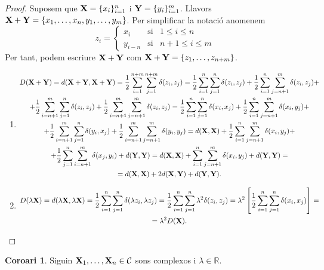 \documentclass{article}
\theoremstyle{definition}
\newtheorem{corollary}[definition]{Coro\lgem ari}
\newcommand{\0}{\ensuremath{\vb{0}}}
\newcommand{\X}{\ensuremath{\vb{X}}}
\newcommand{\Y}{\ensuremath{\vb{Y}}}
\newcommand{\RR}{\ensuremath{\mathbb{R}}} %
\begin{document}
\begin{proof}
    Suposem que $\X=\{x_i\}_{i=1}^n$ i $\Y=\{y_i\}_{i=1}^m$. Llavors $\X+\Y=\{x_1,\ldots,x_n,y_1,\ldots,y_m\}$. Per simplificar la notació anomenem $$
    z_i=\left\{
    \begin{array}{ccc}
        x_i & \text{si} & 1\leq i\leq n\\
        y_{i-n} & \text{si} & n+1\leq i\leq m
    \end{array}\right.
    $$ Per tant, podem escriure $\X+\Y$ com $\X+\Y=\{z_1,\ldots,z_{n+m}\}$.
    \begin{enumerate}
        \item 
        \begin{multline*}
            D(\X+\Y)=d(\X+\Y,\X+\Y)=\frac{1}{2}\sum_{i=1}^{n+m}\sum_{j=1}^{n+m}\delta(z_i,z_j)=\frac{1}{2}\sum_{i=1}^n\sum_{j=1}^n\delta(z_i,z_j)+\frac{1}{2}\sum_{i=1}^n\sum_{j=n+1}^m\delta(z_i,z_j)+\\+\frac{1}{2}\sum_{i=n+1}^m\sum_{j=1}^n\delta(z_i,z_j)+\frac{1}{2}\sum_{i=n+1}^m\sum_{j=n+1}^m\delta(z_i,z_j)=\frac{1}{2}\sum_{i=1}^n\sum_{j=1}^n\delta(x_i,x_j)+\frac{1}{2}\sum_{i=1}^n\sum_{j=n+1}^m\delta(x_i,y_j)+\\+\frac{1}{2}\sum_{i=n+1}^m\sum_{j=1}^n\delta(y_i,x_j)+\frac{1}{2}\sum_{i=n+1}^m\sum_{j=n+1}^m\delta(y_i,y_j)=d(\X,\X)+\frac{1}{2}\sum_{i=1}^n\sum_{j=n+1}^m\delta(x_i,y_j)+\\+\frac{1}{2}\sum_{j=1}^n\sum_{i=n+1}^m\delta(x_j,y_i)+d(\Y,\Y)=d(\X,\X)+\sum_{i=1}^n\sum_{j=n+1}^m\delta(x_i,y_j)+d(\Y,\Y)=\\=d(\X,\X)+2d(\X,\Y)+d(\Y,\Y).
        \end{multline*}
        \item 
        \begin{multline*}
            D(\lambda\X)=d(\lambda\X,\lambda\X)=\frac{1}{2}\sum_{i=1}^n\sum_{j=1}^n\delta(\lambda z_i,\lambda z_j)=\frac{1}{2}\sum_{i=1}^n\sum_{j=1}^n\lambda^2\delta(z_i,z_j)=\lambda^2\left[\frac{1}{2}\sum_{i=1}^n\sum_{j=1}^n\delta(x_i,x_j)\right]=\\=\lambda^2D(\X).
        \end{multline*}
    \end{enumerate}
\end{proof}
\begin{corollary}
    Siguin $\X_1,\ldots,\X_n\in\mathcal{C}$ sons complexos i $\lambda\in\RR$. 
\end{corollary}
\end{document}
